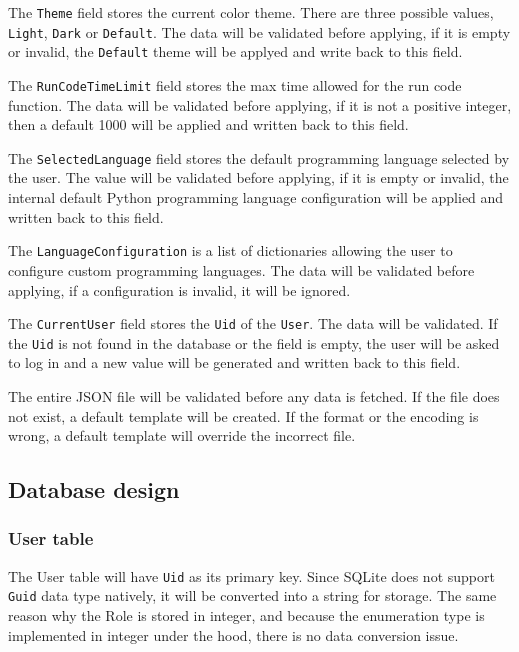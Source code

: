 \documentclass[a4paper]{report}
\begin{document}
The \texttt{Theme} field stores the current color theme. There are three possible values, \texttt{Light}, \texttt{Dark} or \texttt{Default}. The data will be validated before applying, if it is empty or invalid, the \texttt{Default} theme will be applyed and write back to this field.

The \texttt{RunCodeTimeLimit} field stores the max time allowed for the run code function. The data will be validated before applying, if it is not a positive integer, then a default 1000 will be applied and written back to this field. 

The \texttt{SelectedLanguage} field stores the default programming language selected by the user. The value will be validated before applying, if it is empty or invalid, the internal default Python programming language configuration will be applied and written back to this field.

The \texttt{LanguageConfiguration} is a list of dictionaries allowing the user to configure custom programming languages. The data will be validated before applying, if a configuration is invalid, it will be ignored.

The \texttt{CurrentUser} field stores the \texttt{Uid} of the \texttt{User}. The data will be validated. If the \texttt{Uid} is not found in the database or the field is empty, the user will be asked to log in and a new value will be generated and written back to this field.

The entire JSON file will be validated before any data is fetched. If the file does not exist, a default template will be created. If the format or the encoding is wrong, a default template will override the incorrect file.

\subsection{Database design}
\label{subsec:database design}

\subsubsection{User table}

The User table will have \texttt{Uid} as its primary key. Since SQLite does not support \texttt{Guid} data type natively, it will be converted into a string for storage. The same reason why the Role is stored in integer, and because the enumeration type is implemented in integer under the hood, there is no data conversion issue.
\end{document}
